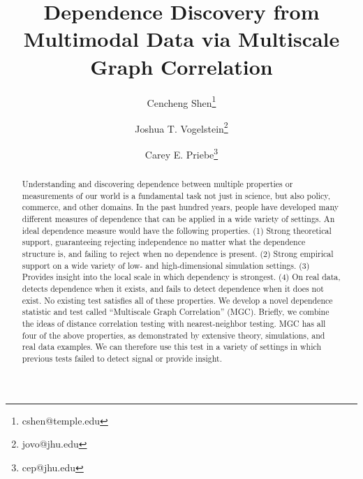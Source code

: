 \documentclass[11pt]{article}
\newcommand{\jv}[1]{{\color{red}{#1}}}
\newcommand{\cs}[1]{{\color{blue}{#1}}}
\begin{document}
\def\spacingset#1{\renewcommand{\baselinestretch}%
{#1}\small\normalsize} \spacingset{1}

\title{\bf Dependence Discovery from Multimodal Data via  Multiscale Graph Correlation}
\author[1]{Cencheng Shen\thanks{cshen@temple.edu}}
\author[2]{Joshua T. Vogelstein\thanks{jovo@jhu.edu}}
\author[3]{Carey E. Priebe\thanks{cep@jhu.edu}}
\maketitle
\pagestyle{empty}

\bigskip
\begin{abstract}
Understanding and discovering dependence between multiple properties or measurements of our world is a fundamental task not just in science, but also policy, commerce, and other domains. In the past hundred years, people have developed many different measures of dependence that can be applied in a wide variety of settings.  An ideal dependence measure would have the following properties. (1) Strong theoretical support, guaranteeing rejecting independence no matter what the dependence structure is, and failing to reject when no dependence is present. (2) Strong empirical support on a wide variety of low- and high-dimensional simulation settings. (3) Provides insight into the local scale in which dependency is strongest. (4) On real data, detects dependence when it exists, and fails to detect dependence when it does not exist. No existing test satisfies all of these properties. We develop a novel dependence statistic and test called ``Multiscale Graph Correlation'' (MGC).  Briefly, we combine the ideas of distance correlation testing with nearest-neighbor testing.  MGC has all four of the above properties, as demonstrated by extensive theory, simulations, and real data examples. We can therefore use this test in a variety of settings in which previous tests failed to detect signal or provide insight.

\cs{ is it a bit strong to say 'No existing test satisfies all of these properties' in the abstract, despite it is true?} 
\jv{ i think it is ok, be we will fine tune the precise wording of the abstract after we complete the rest of the manuscript.}

\end{abstract}
\end{document}
